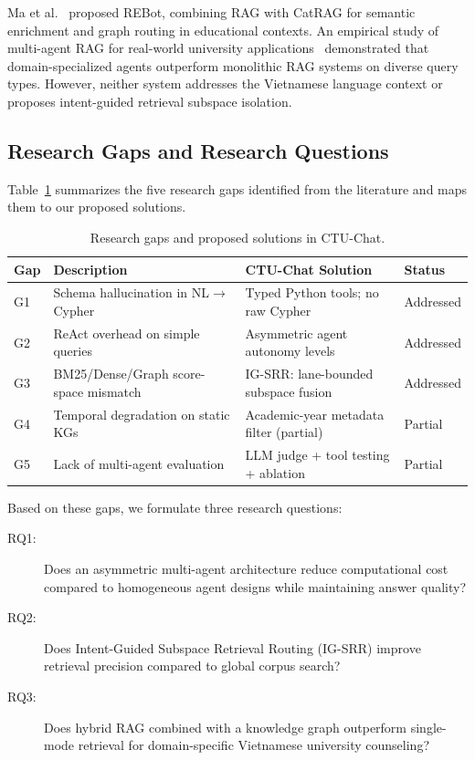 \documentclass[runningheads]{llncs}
\begin{document}
Ma et al.~\cite{ma2025rebot} proposed REBot, combining RAG with CatRAG for semantic enrichment and graph routing in educational contexts. An empirical study of multi-agent RAG for real-world university applications~\cite{multiagent_university2025} demonstrated that domain-specialized agents outperform monolithic RAG systems on diverse query types. However, neither system addresses the Vietnamese language context or proposes intent-guided retrieval subspace isolation.

\subsection{Research Gaps and Research Questions}
\label{sec:research_gaps}

Table~\ref{tab:gaps} summarizes the five research gaps identified from the literature and maps them to our proposed solutions.

\begin{table}[t]
\centering
\caption{Research gaps and proposed solutions in CTU-Chat.}
\label{tab:gaps}
\small
\begin{tabular}{@{}p{0.5cm}p{4.2cm}p{4.2cm}p{1.5cm}@{}}
\toprule
\textbf{Gap} & \textbf{Description} & \textbf{CTU-Chat Solution} & \textbf{Status} \\
\midrule
G1 & Schema hallucination in NL$\to$Cypher & Typed Python tools; no raw Cypher & Addressed \\
G2 & ReAct overhead on simple queries & Asymmetric agent autonomy levels & Addressed \\
G3 & BM25/Dense/Graph score-space mismatch & IG-SRR: lane-bounded subspace fusion & Addressed \\
G4 & Temporal degradation on static KGs & Academic-year metadata filter (partial) & Partial \\
G5 & Lack of multi-agent evaluation & LLM judge + tool testing + ablation & Partial \\
\bottomrule
\end{tabular}
\end{table}

Based on these gaps, we formulate three research questions:

\begin{description}
    \item[RQ1:] Does an asymmetric multi-agent architecture reduce computational cost compared to homogeneous agent designs while maintaining answer quality?
    \item[RQ2:] Does Intent-Guided Subspace Retrieval Routing (IG-SRR) improve retrieval precision compared to global corpus search?
    \item[RQ3:] Does hybrid RAG combined with a knowledge graph outperform single-mode retrieval for domain-specific Vietnamese university counseling?
\end{description}
\end{document}
